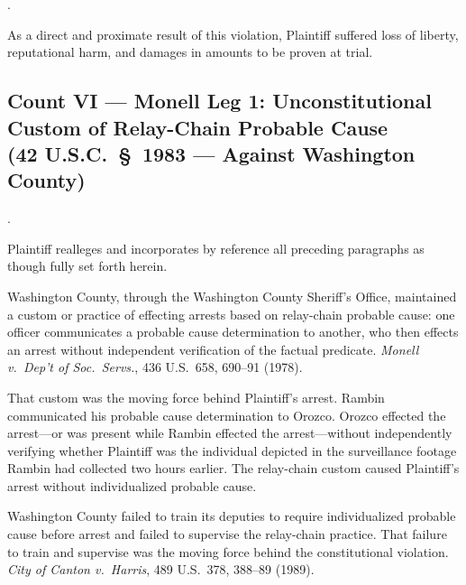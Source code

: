 \documentclass[12pt,letterpaper]{article}
\newcounter{complaintpara}
\newenvironment{paras}{%
	\begin{list}{\arabic{complaintpara}.}{%
			\setlength{\leftmargin}{0.5in}%
			\setlength{\labelwidth}{0.4in}%
			\setlength{\labelsep}{0.1in}%
			\setlength{\itemsep}{0pt}%
			\setlength{\parsep}{0pt}%
			\setlength{\topsep}{6pt}%
		}%
	}{%
	\end{list}%
}
\begin{document}
\begin{paras}
		\item As a direct and proximate result of this violation,
		Plaintiff suffered loss of liberty, reputational harm, and
		damages in amounts to be proven at trial.
		
	\end{paras}
	\subsection*{Count VI --- Monell Leg 1: Unconstitutional Custom of Relay-Chain Probable Cause\\
		(42 U.S.C.\ \S\ 1983 --- Against Washington County)}
	\begin{paras}
		
		\item Plaintiff realleges and incorporates by reference all
		preceding paragraphs as though fully set forth herein.
		
		\item Washington County, through the Washington County
		Sheriff's Office, maintained a custom or practice of
		effecting arrests based on relay-chain probable cause: one
		officer communicates a probable cause determination to
		another, who then effects an arrest without independent
		verification of the factual predicate.
		\textit{Monell v.\ Dep't of Soc.\ Servs.},
		436 U.S.\ 658, 690--91 (1978).
		
		\item That custom was the moving force behind Plaintiff's
		arrest. Rambin communicated his probable cause determination
		to Orozco. Orozco effected the arrest---or was present while
		Rambin effected the arrest---without independently verifying
		whether Plaintiff was the individual depicted in the
		surveillance footage Rambin had collected two hours earlier.
		The relay-chain custom caused Plaintiff's arrest without
		individualized probable cause.
		
		\item Washington County failed to train its deputies to require
		individualized probable cause before arrest and failed to
		supervise the relay-chain practice. That failure to train
		and supervise was the moving force behind the constitutional
		violation. \textit{City of Canton v.\ Harris}, 489 U.S.\ 378, 388--89 (1989).
		

\end{paras}
\end{document}
